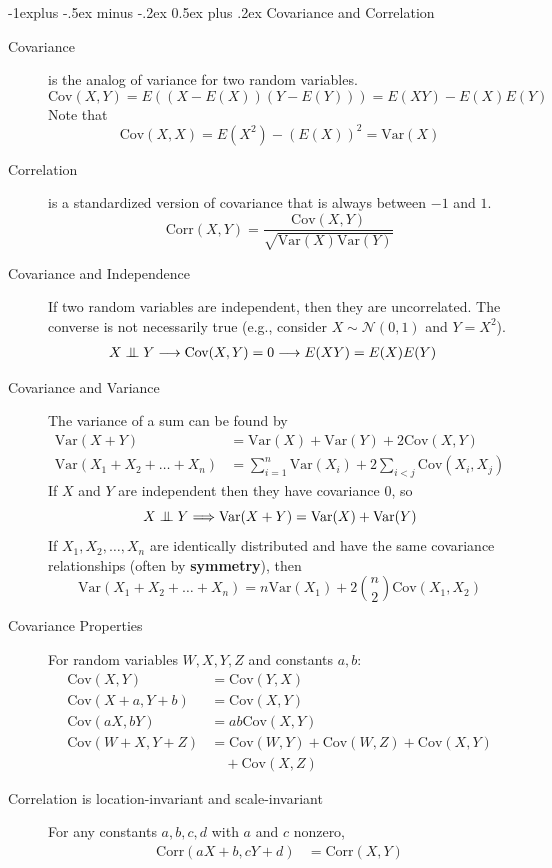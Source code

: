 \documentclass[10pt,landscape]{article}
\makeatletter
\newcommand\independent{\protect\mathpalette{\protect\independenT}{\perp}}
\def\independenT#1#2{\mathrel{\setbox0\hbox{$#1#2$}%
    \copy0\kern-\wd0\mkern4mu\box0}}
\newcommand{\var}{\textrm{Var}}
\newcommand{\cov}{\textrm{Cov}}
\newcommand{\corr}{\textrm{Corr}}
\newcommand{\N}{\mathcal{N}}
\renewcommand{\subsection}{\@startsection{subsection}{2}{0mm}%
                                {-1explus -.5ex minus -.2ex}%
                                {0.5ex plus .2ex}%
                                {\normalfont\normalsize\bfseries}}
\makeatother
\begin{document}
\begin{multicols*}{3}
	\subsection{Covariance and Correlation}
	\begin{description}
		\item [Covariance] is the analog of variance for two random variables.
		\[\cov(X, Y) = E\left((X - E(X))(Y - E(Y))\right) = E(XY) - E(X)E(Y)\]
		Note that 
		\[\cov(X, X) = E(X^2) - (E(X))^2 =  \var(X)\]
		\item [Correlation] is a standardized version of covariance that is always between $-1$ and $1$.
		\[\corr(X, Y) = \frac{\cov(X, Y)}{\sqrt{\var(X)\var(Y)}} \]
		\item [Covariance and Independence] If two random variables are independent, then they are uncorrelated. The converse is not necessarily true (e.g., consider $X \sim \N(0,1)$ and $Y=X^2$).
		\begin{align*}
			X \independent Y & \longrightarrow \cov(X, Y) = 0 \longrightarrow E(XY) = E(X)E(Y) 
		\end{align*}
		\item [Covariance and Variance]  The variance of a sum can be found by
		\begin{align*}
			\var(X + Y)                    & = \var(X) + \var(Y) + 2\cov(X, Y)                          \\
			\var(X_1 + X_2 + \dots + X_n ) & = \sum_{i = 1}^{n}\var(X_i) + 2\sum_{i < j} \cov(X_i, X_j) 
		\end{align*}
		If $X$ and $Y$ are independent then they have covariance $0$, so
		\[X \independent Y \Longrightarrow \var(X + Y) = \var(X) + \var(Y)\]
		If $X_1, X_2, \dots, X_n$ are identically distributed and have the same covariance relationships (often by \textbf{symmetry}), then 
		\[\var(X_1 + X_2 + \dots + X_n ) = n\var(X_1) + 2{n \choose 2}\cov(X_1, X_2)\]
		\item [Covariance Properties]  For random variables $W, X, Y, Z$ and constants $a, b$:
		\begin{align*}
			\cov(X, Y)         & = \cov(Y, X)                           \\
			\cov(X + a, Y + b) & = \cov(X, Y)                           \\
			\cov(aX, bY)       & = ab\cov(X, Y)                         \\
			\cov(W + X, Y + Z) & = \cov(W, Y) + \cov(W, Z) + \cov(X, Y) \\
			                   & \quad + \cov(X, Z)                     
		\end{align*}
		\item [Correlation is location-invariant and scale-invariant] For any constants $a,b,c,d$ with $a$ and $c$ nonzero,
		\begin{align*}
			\corr(aX + b, cY + d) & = \corr(X, Y) 
		\end{align*}
	\end{description}
			

\end{multicols*}
\end{document}
